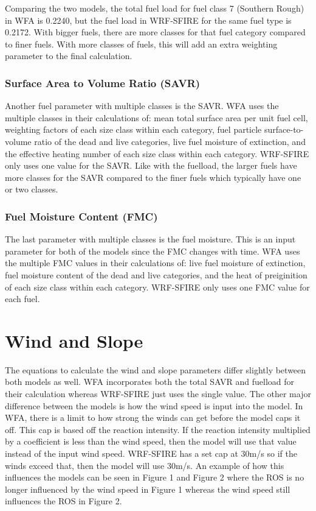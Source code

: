 \documentclass{article}
\begin{document}
 
 Comparing the two models, the total fuel load for fuel class 7 (Southern Rough) in WFA is 0.2240, but the fuel load in WRF-SFIRE for the same fuel type is 0.2172. With bigger fuels, there are more classes for that fuel category compared to finer fuels. With more classes of fuels, this will add an extra weighting parameter to the final calculation. 
 
\subsubsection{Surface Area to Volume Ratio (SAVR)}
Another fuel parameter with multiple classes is the SAVR. WFA uses the multiple classes in their calculations of: mean total surface area per unit fuel cell, weighting factors of each size class within each category, fuel particle surface-to-volume ratio of the dead and live categories, live fuel moisture of extinction, and the effective heating number of each size class within each category. WRF-SFIRE only uses one value for the SAVR. Like with the fuelload, the larger fuels have more classes for the SAVR compared to the finer fuels which typically have one or two classes. 

\subsubsection{Fuel Moisture Content (FMC)}
The last parameter with multiple classes is the fuel moisture. This is an input parameter for both of the models since the FMC changes with time. WFA uses the multiple FMC values in their calculations of: live fuel moisture of extinction, fuel moisture content of the dead and live categories, and the heat of preiginition of each size class within each category. WRF-SFIRE only uses one FMC value for each fuel. 

 \section{Wind and Slope}
 
 The equations to calculate the wind and slope parameters differ slightly between both models as well. WFA incorporates both the total SAVR and fuelload for their calculation whereas WRF-SFIRE just uses the single value. The other major difference between the models is how the wind speed is input into the model. In WFA, there is a limit to how strong the winds can get before the model caps it off. This cap is based off the reaction intensity. If the reaction intensity multiplied by a coefficient is less than the wind speed, then the model will use that value instead of the input wind speed. WRF-SFIRE has a set cap at 30m/s so if the winds exceed that, then the model will use 30m/s. An example of how this influences the models can be seen in Figure 1 and Figure 2 where the ROS is no longer influenced by the wind speed in Figure 1 whereas the wind speed still influences the ROS in Figure 2. 
\end{document}
